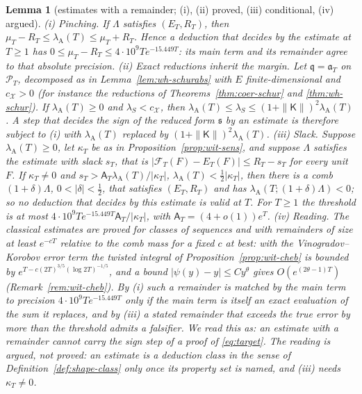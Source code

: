 \documentclass[11pt]{amsart}
\newtheorem{lemma}[theorem]{Lemma}
\theoremstyle{definition}
\theoremstyle{remark}
\newcommand{\PT}{\mathcal P_T}
\newcommand{\lamA}{\lambda_{\mathrm A}(T)}
\newcommand{\Aconst}{\mathsf A_T}
\begin{document}
\begin{lemma}[estimates with a remainder; (i), (ii) proved, (iii) conditional, (iv) argued]\label{lem:shape-est}
\emph{(i) Pinching.} If $\Lambda$ satisfies $(E_T,R_T)$, then $\mu_T-R_T\le\lamA\le\mu_T+R_T$. Hence a deduction that decides by the
estimate at $T\ge1$ has $0\le\mu_T-R_T\le4\cdot10^9Te^{-15.449T}$: its main term and its remainder agree to that absolute precision.
\emph{(ii) Exact reductions inherit the margin.} Let $\mathfrak q=\mathfrak a_T$ on $\PT$, decomposed as in Lemma~\ref{lem:wh-schurabs}
with $E$ finite-dimensional and $c_{\mathcal X}>0$ (for instance the reductions of Theorems~\ref{thm:coer-schur} and \ref{thm:wh-schur}).
If $\lamA\ge0$ and $\lambda_S<c_{\mathcal X}$, then $\lamA\le\lambda_S\le(1+\|\mathsf K\|)^2\lamA$. A step that decides the sign of
the reduced form $\mathfrak s$ by an estimate is therefore subject to (i) with $\lamA$ replaced by $(1+\|\mathsf K\|)^2\lamA$.
\emph{(iii) Slack.} Suppose $\lamA\ge0$, let $\kappa_T$ be as in Proposition~\ref{prop:wit-sens}, and suppose $\Lambda$ satisfies the
estimate with slack $s_T$, that is $|\mathcal F_T(F)-E_T(F)|\le R_T-s_T$ for every unit $F$. If $\kappa_T\ne0$ and
$s_T>\Aconst\lamA/|\kappa_T|$, $\lamA<\frac12|\kappa_T|$, then there is a comb $(1+\delta)\Lambda$, $0<|\delta|<\frac12$, that satisfies
$(E_T,R_T)$ and has $\lambda_{\mathrm A}(T;(1+\delta)\Lambda)<0$; so no deduction that decides by this estimate is valid at $T$. For
$T\ge1$ the threshold is at most $4\cdot10^9Te^{-15.449T}\Aconst/|\kappa_T|$, with $\Aconst=(4+o(1))e^T$.
\emph{(iv) Reading.} The classical estimates are proved for classes of sequences and with remainders of size at least
$e^{-cT}$ relative to the comb mass for a fixed $c$ at best: with the Vinogradov--Korobov error term the twisted integral of
Proposition~\ref{prop:wit-cheb} is bounded by $e^{T-c(2T)^{3/5}(\log2T)^{-1/5}}$, and a bound $|\psi(y)-y|\le Cy^\theta$ gives
$O(e^{(2\theta-1)T})$ (Remark~\ref{rem:wit-cheb}). By (i) such a remainder is matched by the main term to precision
$4\cdot10^9Te^{-15.449T}$ only if the main term is itself an exact evaluation of the sum it replaces, and by (iii) a stated remainder that
exceeds the true error by more than the threshold admits a falsifier. We read this as: an estimate with a remainder cannot carry the
sign step of a proof of \eqref{eq:target}. The reading is argued, not proved: an estimate is a deduction class in the sense of
Definition~\ref{def:shape-class} only once its property set is named, and (iii) needs $\kappa_T\ne0$.
\end{lemma}
\end{document}
